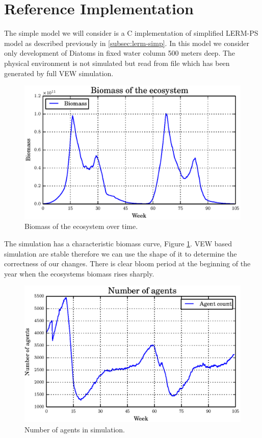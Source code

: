 \documentclass[12pt, a4paper]{report}
\begin{document}
\section{Reference Implementation}\label{sec:ref-impl}

The simple model we will consider is a C implementation of simplified
LERM-PS model as described previously in \ref{subsec:lerm-simp}. In this
model we consider only development of Diatoms in fixed water column 500
meters deep. The physical environment is not simulated but read from
file which has been generated by full VEW simulation.

\begin{figure}[H]
  \begin{center}
    \includegraphics[width=\columnwidth]{graphs/master-bio.eps}
    \caption{Biomass of the ecosystem over time.}
    \label{fig:master-bio}
  \end{center}
\end{figure}

The simulation has a characteristic biomass curve, Figure \ref{fig:master-bio}.
VEW based simulation are stable therefore we can use the shape of it to
determine the correctness of our changes. There is clear bloom period at the
beginning of the year when the ecosystems biomass rises sharply.

\begin{figure}[H]
  \begin{center}
    \includegraphics[width=\columnwidth]{graphs/master-ag.eps}
    \caption{Number of agents in simulation.}
    \label{fig:master-ag}
  \end{center}
\end{figure}
\end{document}
